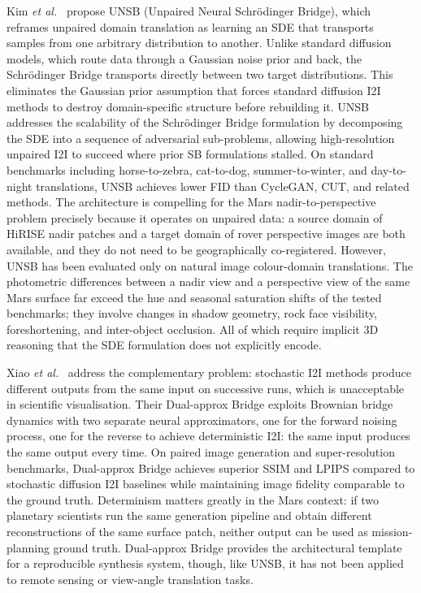 \documentclass[10pt,journal]{IEEEtran}
\begin{document}
Kim \textit{et al.}~\cite{kim2024unsb} propose UNSB (Unpaired Neural
Schr{\"o}dinger Bridge), which reframes unpaired domain translation as learning
an SDE that transports samples from one arbitrary distribution to another. Unlike
standard diffusion models, which route data through a Gaussian noise prior and
back, the Schr{\"o}dinger Bridge transports directly between two target
distributions. This eliminates the Gaussian prior assumption that forces standard
diffusion I2I methods to destroy domain-specific structure before rebuilding it.
UNSB addresses the scalability of the Schr{\"o}dinger Bridge formulation by
decomposing the SDE into a sequence of adversarial sub-problems, allowing
high-resolution unpaired I2I to succeed where prior SB formulations stalled.
On standard benchmarks including horse-to-zebra, cat-to-dog, summer-to-winter,
and day-to-night translations, UNSB achieves lower FID than CycleGAN, CUT, and
related methods. The architecture is compelling for the Mars nadir-to-perspective
problem precisely because it operates on unpaired data: a source domain of
HiRISE nadir patches and a target domain of rover perspective images are both
available, and they do not need to be geographically co-registered. However,
UNSB has been evaluated only on natural image colour-domain translations. The
photometric differences between a nadir view and a perspective view of the
same Mars surface far exceed the hue and seasonal saturation shifts of the tested
benchmarks; they involve changes in shadow geometry, rock face visibility,
foreshortening, and inter-object occlusion. All of which require implicit 3D
reasoning that the SDE formulation does not explicitly encode.

Xiao \textit{et al.}~\cite{xiao2025brownian} address the complementary problem:
stochastic I2I methods produce different outputs from the same input on
successive runs, which is unacceptable in scientific visualisation. Their
Dual-approx Bridge exploits Brownian bridge dynamics with two separate neural
approximators, one for the forward noising process, one for the reverse to
achieve deterministic I2I: the same input produces the same output every time.
On paired image generation and super-resolution benchmarks, Dual-approx Bridge
achieves superior SSIM and LPIPS compared to stochastic diffusion I2I baselines
while maintaining image fidelity comparable to the ground truth. Determinism
matters greatly in the Mars context: if two planetary scientists run the same
generation pipeline and obtain different reconstructions of the same surface
patch, neither output can be used as mission-planning ground truth. Dual-approx
Bridge provides the architectural template for a reproducible synthesis system,
though, like UNSB, it has not been applied to remote sensing or view-angle
translation tasks.
\end{document}
